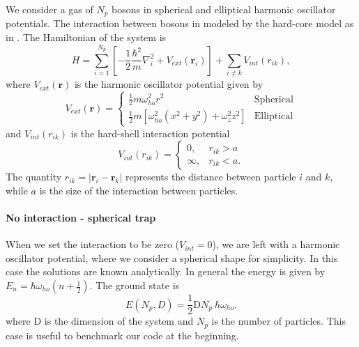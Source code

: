 We consider a gas of $N_p$ bosons in spherical and elliptical harmonic oscillator potentials. The interaction between bosons in modeled by the hard-core model as in \cite{vmcarticle}. %
The Hamiltonian of the system is 
\begin{equation}
H = \sum_{i=1}^{N_p}\left[ -\frac{1}{2}\frac{\hbar^2}{m}\nabla_i^2 + V_{ext}(\textbf{r}_i) \right]+ \sum_{i \neq k} V_{int}(r_{ik}),
\label{eq_hamilton}
\end{equation}
where $V_{ext}(\textbf{r})$ is the harmonic oscillator potential given by
\begin{equation*}
V_{ext}(\textbf{r})=\begin{cases}
\frac{1}{2}m\omega_{ho}^2r^2 &\text{Spherical}\\
\frac{1}{2}m\left[ \omega_{ho}^2 \left(x^2 + y^2 \right) + \omega_z^2 z^2\right] &\text{Elliptical}
\end{cases}
\end{equation*}
and $V_{int}(r_{ik})$ is the hard-shell interaction potential 
\begin{equation*}
V_{int}(r_{ik}) = \begin{cases}
 0, & r_{ik} > a \\
 \infty, & r_{ik} < a.
\end{cases}
\end{equation*}
The quantity $r_{ik} = |\textbf{r}_i-\textbf{r}_k|$ represents the distance between particle $i$ and $k$, while $a$ is the size of the interaction between particles. 

\paragraph{No interaction - spherical trap} When we set the interaction to be zero ($V_{int}=0$), we are left with a harmonic oscillator potential, where we consider a spherical shape for simplicity. In this case the solutions are known analytically. In general the energy is given by $E_n=\hbar\omega_{ho}(n+\frac{1}{2})$. The ground state is 
\begin{equation*}
E(N_p,D) = \frac{1}{2}\text{D} N_p\ \hbar\omega_{ho}.
\label{analitica}
\end{equation*}
where D is the dimension of the system and $N_p$ is the number of particles. This case is useful to benchmark our code at the beginning.

